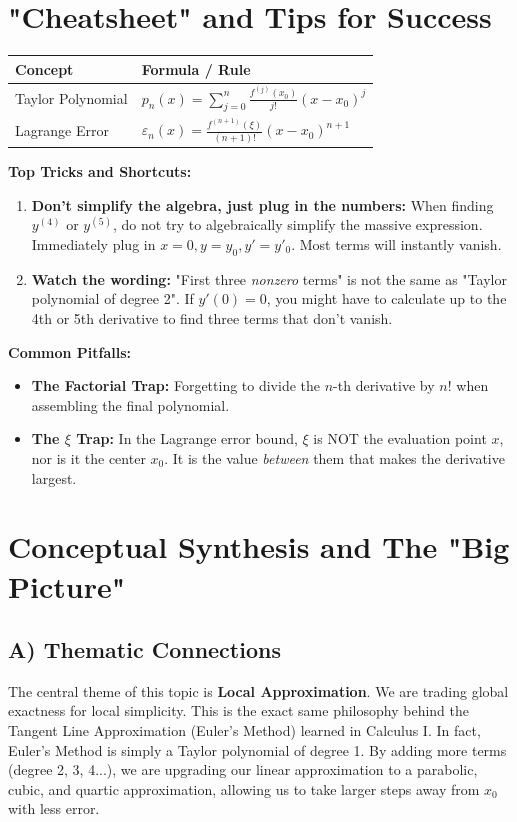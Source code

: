 \documentclass[11pt, letterpaper]{article}
\theoremstyle{definition}
\theoremstyle{remark}
\begin{document}
\section{"Cheatsheet" and Tips for Success}

\renewcommand{\arraystretch}{1.5}
\begin{tabularx}{\textwidth}{l X}
\toprule
\textbf{Concept} & \textbf{Formula / Rule} \\
\midrule
Taylor Polynomial & $\displaystyle p_n(x) = \sum_{j=0}^n \frac{f^{(j)}(x_0)}{j!} (x - x_0)^j$ \\
Lagrange Error & $\displaystyle \varepsilon_n(x) = \frac{f^{(n+1)}(\xi)}{(n+1)!} (x - x_0)^{n+1}$ \\
\bottomrule
\end{tabularx}

\textbf{Top Tricks and Shortcuts:}
\begin{enumerate}
    \item \textbf{Don't simplify the algebra, just plug in the numbers:} When finding $y^{(4)}$ or $y^{(5)}$, do not try to algebraically simplify the massive expression. Immediately plug in $x=0, y=y_0, y'=y'_0$. Most terms will instantly vanish.
    \item \textbf{Watch the wording:} "First three \textit{nonzero} terms" is not the same as "Taylor polynomial of degree 2". If $y'(0)=0$, you might have to calculate up to the 4th or 5th derivative to find three terms that don't vanish.
\end{enumerate}

\textbf{Common Pitfalls:}
\begin{itemize}
    \item \textbf{The Factorial Trap:} Forgetting to divide the $n$-th derivative by $n!$ when assembling the final polynomial.
    \item \textbf{The $\xi$ Trap:} In the Lagrange error bound, $\xi$ is NOT the evaluation point $x$, nor is it the center $x_0$. It is the value \textit{between} them that makes the derivative largest.
\end{itemize}

\newpage
\section{Conceptual Synthesis and The "Big Picture"}

\subsection{A) Thematic Connections}
The central theme of this topic is \textbf{Local Approximation}. We are trading global exactness for local simplicity. This is the exact same philosophy behind the Tangent Line Approximation (Euler's Method) learned in Calculus I. In fact, Euler's Method is simply a Taylor polynomial of degree 1. By adding more terms (degree 2, 3, 4...), we are upgrading our linear approximation to a parabolic, cubic, and quartic approximation, allowing us to take larger steps away from $x_0$ with less error.
\end{document}

